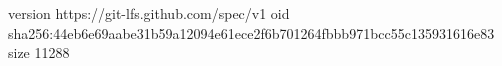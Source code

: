 version https://git-lfs.github.com/spec/v1
oid sha256:44eb6e69aabe31b59a12094e61ece2f6b701264fbbb971bcc55c135931616e83
size 11288

